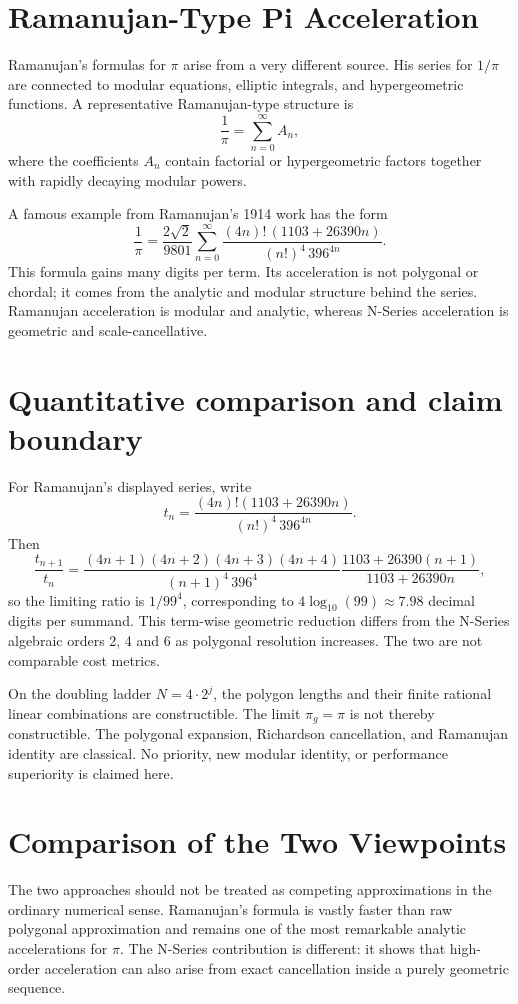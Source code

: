 \documentclass[11pt]{article}
\begin{document}
\section{Ramanujan-Type Pi Acceleration}

Ramanujan's formulas for $\pi$ arise from a very different source. His series
for $1/\pi$ are connected to modular equations, elliptic integrals, and
hypergeometric functions. A representative Ramanujan-type structure is
\[
  \frac{1}{\pi} = \sum_{n=0}^{\infty} A_n,
\]
where the coefficients $A_n$ contain factorial or hypergeometric factors
together with rapidly decaying modular powers.

A famous example from Ramanujan's 1914 work has the form
\[
  \frac{1}{\pi}
  = \frac{2\sqrt{2}}{9801}
    \sum_{n=0}^{\infty}
    \frac{(4n)!\,(1103+26390n)}{(n!)^4\,396^{4n}} .
\]
This formula gains many digits per term. Its acceleration is not polygonal or
chordal; it comes from the analytic and modular structure behind the series.
Ramanujan acceleration is modular and analytic, whereas N-Series acceleration
is geometric and scale-cancellative.

\section{Quantitative comparison and claim boundary}
For Ramanujan's displayed series, write
\[
t_n=\frac{(4n)!(1103+26390n)}{(n!)^4\,396^{4n}}.
\]
Then
\[
\frac{t_{n+1}}{t_n}=
\frac{(4n+1)(4n+2)(4n+3)(4n+4)}{(n+1)^4\,396^4}
\frac{1103+26390(n+1)}{1103+26390n},
\]
so the limiting ratio is \(1/99^4\), corresponding to
\(4\log_{10}(99)\approx7.98\) decimal digits per summand.
This term-wise geometric reduction differs from the N-Series
algebraic orders 2, 4 and 6 as polygonal resolution increases.
The two are not comparable cost metrics.

On the doubling ladder \(N=4\cdot2^j\), the polygon lengths
and their finite rational linear combinations are constructible.
The limit \(\pi_g=\pi\) is not thereby constructible.
The polygonal expansion, Richardson cancellation, and Ramanujan
identity are classical. No priority, new modular identity,
or performance superiority is claimed here.

\section{Comparison of the Two Viewpoints}

The two approaches should not be treated as competing approximations in the
ordinary numerical sense. Ramanujan's formula is vastly faster than raw
polygonal approximation and remains one of the most remarkable analytic
accelerations for $\pi$. The N-Series contribution is different: it shows that
high-order acceleration can also arise from exact cancellation inside a purely
geometric sequence.
\end{document}
